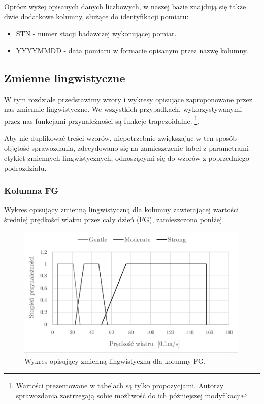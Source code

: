 \documentclass{classrep}
\begin{document}
Oprócz wyżej opisanych danych liczbowych, w naszej bazie znajdują się także dwie dodatkowe kolumny, służące do identyfikacji pomiaru:
\begin{itemize}[label=$\bullet$\scshape\bfseries]
\item STN - numer stacji badawczej wykonującej pomiar.
\item YYYYMMDD - data pomiaru w formacie opisanym przez nazwę kolumny.
\end{itemize}




\subsection{Zmienne lingwistyczne}
W tym rozdziale przedstawimy wzory i wykresy opisujące zaproponowane przez nas zmiennie lingwistyczne. We wszystkich przypadkach, wykorzystywanymi przez nas funkcjami przynależności są funkcje trapezoidalne.  \footnote{Wartości prezentowane w tabelach są tylko propozycjami. Autorzy sprawozdania zastrzegają sobie możliwość do ich późniejszej modyfikacji}.\newline

Aby nie duplikować treści wzorów, niepotrzebnie zwiększając w ten sposób objętość sprawozdania, zdecydowano się na zamieszczenie tabel z parametrami etykiet zmiennych lingwistycznych, odnoszącymi się do wzorów z poprzedniego podrozdziału.

\clearpage



\subsubsection{Kolumna FG}
Wykres opisujący zmienną lingwistyczną dla kolumny zawierającej wartości średniej prędkości wiatru przez cały dzień (FG), zamieszczono poniżej.
\begin{figure}[H]
	\centering
	\includegraphics[width=0.99\textwidth]{Pictures/TermsCharts/FG.png}
	\caption{Wykres opisujący zmienną lingwistyczną dla kolumny FG.}
\end{figure}
\end{document}
